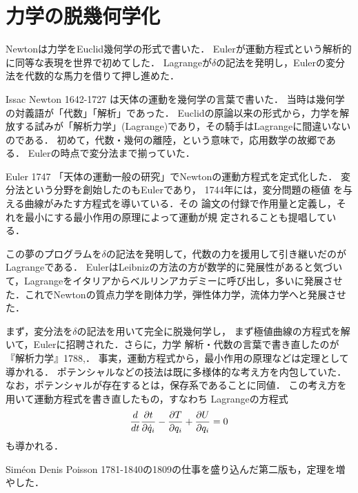 \documentclass[uplatex, dvipdfmx]{jsreport}
\begin{document}
\section{力学の脱幾何学化}

\begin{tcolorbox}[colframe=ForestGreen, colback=ForestGreen!10!white,breakable,colbacktitle=ForestGreen!40!white,coltitle=black,fonttitle=\bfseries\sffamily,
title=]
    Newtonは力学をEuclid幾何学の形式で書いた．
    Eulerが運動方程式という解析的に同等な表現を世界で初めてした．
    Lagrangeが$\delta$の記法を発明し，Eulerの変分法を代数的な馬力を借りて押し進めた．
\end{tcolorbox}

\begin{history}[幾何学の時代]
    Issac Newton 1642-1727 は天体の運動を幾何学の言葉で書いた．
    当時は幾何学の対義語が「代数」「解析」であった．
    Euclidの原論以来の形式から，力学を解放する試みが「解析力学」(Lagrange)であり，その騎手はLagrangeに間違いないのである．
    初めて，代数・幾何の離陸，という意味で，応用数学の故郷である．
    Eulerの時点で変分法まで揃っていた．
\end{history}

\begin{history}
    Euler 1747 \cite{Euler1747}「天体の運動一般の研究」でNewtonの運動方程式を定式化した．
    変分法という分野を創始したのもEulerであり，
    1744年には，変分問題の極値
    を与える曲線がみたす方程式を導いている．その
    論文の付録で作用量と定義し，そ
    れを最小にする最小作用の原理によって運動が規
    定されることも提唱している．

    この夢のプログラムを$\delta$の記法を発明して，代数の力を援用して引き継いだのがLagrangeである．
    EulerはLeibnizの方法の方が数学的に発展性があると気づいて，Lagrangeをイタリアからベルリンアカデミーに呼び出し，多いに発展させた．これでNewtonの質点力学を剛体力学，弾性体力学，流体力学へと発展させた．
\end{history}

\begin{history}
    まず，変分法を$\delta$の記法を用いて完全に脱幾何学し，
    まず極値曲線の方程式を解いて，Eulerに招聘された．さらに，力学
    解析・代数の言葉で書き直したのが『解析力学』1788,\cite{Lagrange1788}．
    事実，運動方程式から，最小作用の原理などは定理として導かれる．
    ポテンシャルなどの技法は既に多様体的な考え方を内包していた．なお，ポテンシャルが存在するとは，保存系であることに同値．
    この考え方を用いて運動方程式を書き直したもの，すなわち
    Lagrangeの方程式
    \[\frac{d }{d t}\frac{\partial t}{\partial \dot{q}_i}-\frac{\partial T}{\partial q_i}+\frac{\partial U}{\partial q_i}=0\]
    も導かれる．

    Siméon Denis Poisson 1781-1840の1809の仕事を盛り込んだ第二版も，定理を増やした．
\end{history}
\end{document}
